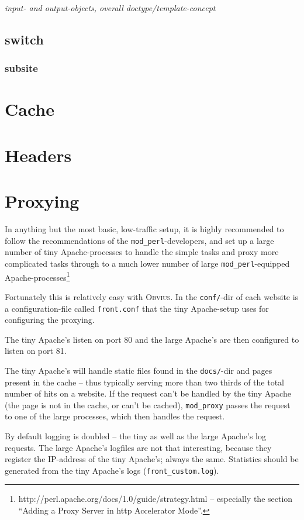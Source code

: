 \documentclass[a4paper,12pt]{article}
\newcommand{\obvius}{\textsc{Obvius}}
\newcommand{\modperl}{\texttt{mod\_perl}}
\newcommand{\modproxy}{\texttt{mod\_proxy}}
\begin{document}
\emph{input- and output-objects, overall doctype/template-concept}

\subsection{switch}

\subsubsection{subsite}


\section{Cache}


\section{Headers}


\pagebreak
\appendix
\section{Proxying}\label{proxying}

In anything but the most basic, low-traffic setup, it is highly
recommended to follow the recommendations of the \modperl-developers,
and set up a large number of tiny Apache-processes to handle the
simple tasks and proxy more complicated tasks through to a much lower
number of large \modperl-equipped
Apache-processes\footnote{http://perl.apache.org/docs/1.0/guide/strategy.html
  -- especially the section ``Adding a Proxy Server in http Accelerator Mode''.}

Fortunately this is relatively easy with \obvius. In the
\texttt{conf/}-dir of each website is a configuration-file called
\texttt{front.conf} that the tiny Apache-setup uses for configuring
the proxying.

The tiny Apache's listen on port 80 and the large Apache's are then
configured to listen on port 81.

The tiny Apache's will handle static files found in the
\texttt{docs/}-dir and pages present in the cache -- thus typically
serving more than two thirds of the total number of hits on a website.
If the request can't be handled by the tiny Apache (the page is not in
the cache, or can't be cached), {\modproxy} passes the request to one
of the large processes, which then handles the request.

By default logging is doubled -- the tiny as well as the large
Apache's log requests. The large Apache's logfiles are not that
interesting, because they register the IP-address of the tiny
Apache's; always the same. Statistics should be generated from the
tiny Apache's logs (\texttt{front\_custom.log}).
\end{document}
